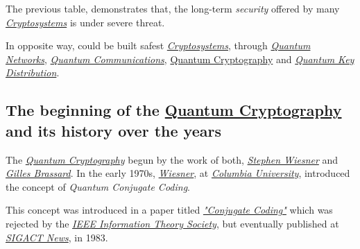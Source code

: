 \documentclass[conference]{IEEEtran}
\begin{document}
\newpage

The previous table, demonstrates that, the long-term \textit{security} offered by many \href{https://en.wikipedia.org/wiki/Cryptosystem}{\textit{Cryptosystems}} is under severe threat.

\vspace{4pt}

In opposite way, could be built safest \href{https://en.wikipedia.org/wiki/Cryptosystem}{\textit{Cryptosystems}}, through \href{https://en.wikipedia.org/wiki/Quantum_network}{\textit{Quantum Networks}}, \href{https://en.wikipedia.org/wiki/Quantum_information_science}{\textit{Quantum Communications}}, \href{https://en.wikipedia.org/wiki/Quantum_cryptography}{Quantum Cryptography} and \href{https://en.wikipedia.org/wiki/Quantum_key_distribution}{\textit{Quantum Key Distribution}}.

\vspace{6pt}

\subsection{The beginning of the \href{https://en.wikipedia.org/wiki/Quantum_cryptography}{Quantum Cryptography}\\ and its history over the years}\label{A4}

\vspace{4pt}

The \href{https://en.wikipedia.org/wiki/Quantum_cryptography}{\textit{Quantum Cryptography}} begun by the work of both, \href{https://en.wikipedia.org/wiki/Stephen_Wiesner}{\textit{Stephen Wiesner}} and \href{https://en.wikipedia.org/wiki/Gilles_Brassard}{\textit{Gilles Brassard}}. In the early 1970s, \href{https://en.wikipedia.org/wiki/Stephen_Wiesner}{\textit{Wiesner}}, at \href{https://en.wikipedia.org/wiki/Columbia_University}{\textit{Columbia University}}, introduced the concept of \textit{Quantum Conjugate Coding}.

\vspace{4pt}

This concept was introduced in a paper titled \href{https://dl.acm.org/citation.cfm?id=1008920}{\textit{"Conjugate Coding"}} which was rejected by the \href{https://www.itsoc.org/}{\textit{IEEE Information Theory Society}}, but eventually published at \href{https://www.sigact.org/SIGACT_News/}{\textit{SIGACT News}}, in 1983.

\vspace{4pt}
\end{document}
